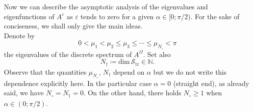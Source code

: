 \documentclass[11pt,a4paper]{article}
\newcommand{\eps}{\varepsilon}
\newcommand{\Om}{\Omega}
\newcommand{\mrm}[1]{\mathrm{#1}}
\newcommand{\N}{\mathbb{N}}
\newcommand{\mX}{\mathscr{S}}
\renewcommand{\dim}{\mrm{dim}}
\begin{document}
Now we can describe the asymptotic analysis of the eigenvalues and eigenfunctions of $A^\eps$ as $\eps$ tends to zero for a given $\alpha\in[0;\pi/2)$. For the sake of conciseness, we shall only give the main ideas.\\
\newline
Denote by 
\begin{equation}\label{DefEigenValDS}
0<\mu_1<\mu_2\le \mu_3 \le \cdots \le \mu_{N_\circ}<\pi
\end{equation}
the eigenvalues of the discrete spectrum of $A^\Om$. Set also  
\begin{equation}\label{DefNbEigTR}
N_\dagger\coloneqq\dim\,\mX_{\mrm{tr}}\in\N.
\end{equation}
Observe that the quantities $\mu_{N_\circ}$, $N_\dagger$ depend on $\alpha$ but we do not write this dependence explicitly here. In the particular case $\alpha=0$ (straight end), as already said, we have $N_\circ=N_\dagger=0$. On the other hand, there holds $N_\circ\ge1$ when $\alpha\in(0;\pi/2)$. 
\end{document}
